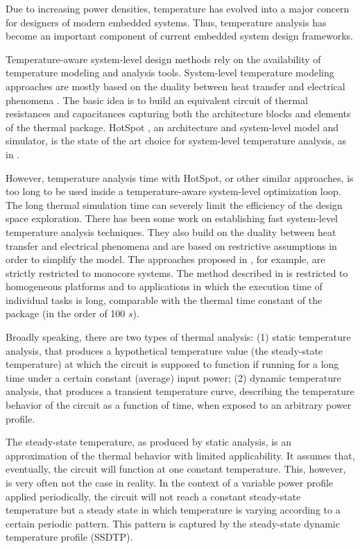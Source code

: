 Due to increasing power densities, temperature has evolved into a major concern for designers of modern embedded systems. Thus, temperature analysis has become an important component of current embedded system design frameworks.

Temperature-aware system-level design methods rely on the availability of temperature modeling and analysis tools. System-level temperature modeling approaches are mostly based on the duality between heat transfer and electrical phenomena \cite{kreith2000}. The basic idea is to build an equivalent circuit of thermal resistances and capacitances capturing both the architecture blocks and elements of the thermal package. HotSpot \cite{huang2003}, an architecture and system-level model and simulator, is the state of the art choice for system-level temperature analysis, as in \cite{srinivasan2004, liao2005, coskun2006, liu2007, huang2009, xiang2010, thiele2011}.

However, temperature analysis time with HotSpot, or other similar approaches, is too long to be used inside a tempera\-ture-aware system-level optimization loop. The long thermal simulation time can severely limit the efficiency of the design space exploration. There has been some work on establishing fast system-level temperature analysis techniques. They also build on the duality between heat transfer and electrical phenomena and are based on restrictive assumptions in order to simplify the model. The approaches proposed in \cite{rai2011, bao2010}, for example, are strictly restricted to monocore systems. The method described in \cite{rao2009} is restricted to homogeneous platforms and to applications in which the execution time of individual tasks is long, comparable with the thermal time constant of the package (in the order of 100 $s$).

Broadly speaking, there are two types of thermal analysis: (1) static temperature analysis, that produces a hypothetical temperature value (the steady-state temperature) at which the circuit is supposed to function if running for a long time under a certain constant (average) input power; (2) dynamic temperature analysis, that produces a transient temperature curve, describing the temperature behavior of the circuit as a function of time, when exposed to an arbitrary power profile.

The steady-state temperature, as produced by static analysis, is an approximation of the thermal behavior with limited applicability. It assumes that, eventually, the circuit will function at one constant temperature.  This, however, is very often not the case in reality. In the context of a variable power profile applied periodically, the circuit will not reach a constant steady-state temperature but a steady state in which temperature is varying according to a certain periodic pattern. This pattern is captured by the steady-state dynamic temperature profile (SSDTP).

